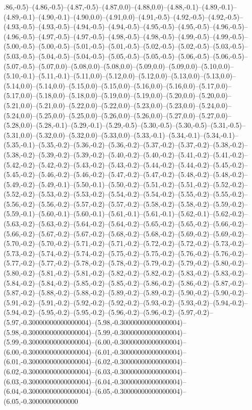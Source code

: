 .86,-0.5)--(4.86,-0.5)--(4.87,-0.5)--(4.87,0.0)--(4.88,0.0)--(4.88,-0.1)--(4.89,-0.1)--(4.89,-0.1)--(4.90,-0.1)--(4.90,0.0)--(4.91,0.0)--(4.91,-0.5)--(4.92,-0.5)--(4.92,-0.5)--(4.93,-0.5)--(4.93,-0.5)--(4.94,-0.5)--(4.94,-0.5)--(4.95,-0.5)--(4.95,-0.5)--(4.96,-0.5)--(4.96,-0.5)--(4.97,-0.5)--(4.97,-0.5)--(4.98,-0.5)--(4.98,-0.5)--(4.99,-0.5)--(4.99,-0.5)--(5.00,-0.5)--(5.00,-0.5)--(5.01,-0.5)--(5.01,-0.5)--(5.02,-0.5)--(5.02,-0.5)--(5.03,-0.5)--(5.03,-0.5)--(5.04,-0.5)--(5.04,-0.5)--(5.05,-0.5)--(5.05,-0.5)--(5.06,-0.5)--(5.06,-0.5)--(5.07,-0.5)--(5.07,0.0)--(5.08,0.0)--(5.08,0.0)--(5.09,0.0)--(5.09,0.0)--(5.10,0.0)--(5.10,-0.1)--(5.11,-0.1)--(5.11,0.0)--(5.12,0.0)--(5.12,0.0)--(5.13,0.0)--(5.13,0.0)--(5.14,0.0)--(5.14,0.0)--(5.15,0.0)--(5.15,0.0)--(5.16,0.0)--(5.16,0.0)--(5.17,0.0)--(5.17,0.0)--(5.18,0.0)--(5.18,0.0)--(5.19,0.0)--(5.19,0.0)--(5.20,0.0)--(5.20,0.0)--(5.21,0.0)--(5.21,0.0)--(5.22,0.0)--(5.22,0.0)--(5.23,0.0)--(5.23,0.0)--(5.24,0.0)--(5.24,0.0)--(5.25,0.0)--(5.25,0.0)--(5.26,0.0)--(5.26,0.0)--(5.27,0.0)--(5.27,0.0)--(5.28,0.0)--(5.28,-0.1)--(5.29,-0.1)--(5.29,-0.5)--(5.30,-0.5)--(5.30,-0.5)--(5.31,-0.5)--(5.31,0.0)--(5.32,0.0)--(5.32,0.0)--(5.33,0.0)--(5.33,-0.1)--(5.34,-0.1)--(5.34,-0.1)--(5.35,-0.1)--(5.35,-0.2)--(5.36,-0.2)--(5.36,-0.2)--(5.37,-0.2)--(5.37,-0.2)--(5.38,-0.2)--(5.38,-0.2)--(5.39,-0.2)--(5.39,-0.2)--(5.40,-0.2)--(5.40,-0.2)--(5.41,-0.2)--(5.41,-0.2)--(5.42,-0.2)--(5.42,-0.2)--(5.43,-0.2)--(5.43,-0.2)--(5.44,-0.2)--(5.44,-0.2)--(5.45,-0.2)--(5.45,-0.2)--(5.46,-0.2)--(5.46,-0.2)--(5.47,-0.2)--(5.47,-0.2)--(5.48,-0.2)--(5.48,-0.2)--(5.49,-0.2)--(5.49,-0.1)--(5.50,-0.1)--(5.50,-0.2)--(5.51,-0.2)--(5.51,-0.2)--(5.52,-0.2)--(5.52,-0.2)--(5.53,-0.2)--(5.53,-0.2)--(5.54,-0.2)--(5.54,-0.2)--(5.55,-0.2)--(5.55,-0.2)--(5.56,-0.2)--(5.56,-0.2)--(5.57,-0.2)--(5.57,-0.2)--(5.58,-0.2)--(5.58,-0.2)--(5.59,-0.2)--(5.59,-0.1)--(5.60,-0.1)--(5.60,-0.1)--(5.61,-0.1)--(5.61,-0.1)--(5.62,-0.1)--(5.62,-0.2)--(5.63,-0.2)--(5.63,-0.2)--(5.64,-0.2)--(5.64,-0.2)--(5.65,-0.2)--(5.65,-0.2)--(5.66,-0.2)--(5.66,-0.2)--(5.67,-0.2)--(5.67,-0.2)--(5.68,-0.2)--(5.68,-0.2)--(5.69,-0.2)--(5.69,-0.2)--(5.70,-0.2)--(5.70,-0.2)--(5.71,-0.2)--(5.71,-0.2)--(5.72,-0.2)--(5.72,-0.2)--(5.73,-0.2)--(5.73,-0.2)--(5.74,-0.2)--(5.74,-0.2)--(5.75,-0.2)--(5.75,-0.2)--(5.76,-0.2)--(5.76,-0.2)--(5.77,-0.2)--(5.77,-0.2)--(5.78,-0.2)--(5.78,-0.2)--(5.79,-0.2)--(5.79,-0.2)--(5.80,-0.2)--(5.80,-0.2)--(5.81,-0.2)--(5.81,-0.2)--(5.82,-0.2)--(5.82,-0.2)--(5.83,-0.2)--(5.83,-0.2)--(5.84,-0.2)--(5.84,-0.2)--(5.85,-0.2)--(5.85,-0.2)--(5.86,-0.2)--(5.86,-0.2)--(5.87,-0.2)--(5.87,-0.2)--(5.88,-0.2)--(5.88,-0.2)--(5.89,-0.2)--(5.89,-0.2)--(5.90,-0.2)--(5.90,-0.2)--(5.91,-0.2)--(5.91,-0.2)--(5.92,-0.2)--(5.92,-0.2)--(5.93,-0.2)--(5.93,-0.2)--(5.94,-0.2)--(5.94,-0.2)--(5.95,-0.2)--(5.95,-0.2)--(5.96,-0.2)--(5.96,-0.2)--(5.97,-0.2)--(5.97,-0.30000000000000004)--(5.98,-0.30000000000000004)--(5.98,-0.30000000000000004)--(5.99,-0.30000000000000004)--(5.99,-0.30000000000000004)--(6.00,-0.30000000000000004)--(6.00,-0.30000000000000004)--(6.01,-0.30000000000000004)--(6.01,-0.30000000000000004)--(6.02,-0.30000000000000004)--(6.02,-0.30000000000000004)--(6.03,-0.30000000000000004)--(6.03,-0.30000000000000004)--(6.04,-0.30000000000000004)--(6.04,-0.30000000000000004)--(6.05,-0.30000000000000004)--(6.05,-0.30000000000000